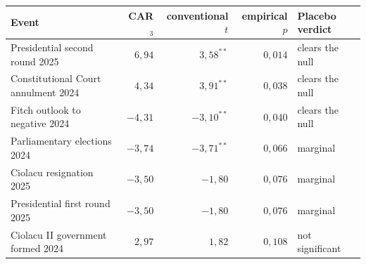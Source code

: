 {\footnotesize\setlength{\tabcolsep}{4pt}
\begin{tabular}{lrrrl}
\toprule
Event & CAR$_3$ & conventional $t$ & empirical $p$ & Placebo verdict \\
\midrule
Presidential second round 2025 & $6{,}94$ & $3{,}58^{**}$ & $0{,}014$ & clears the null \\
Constitutional Court annulment 2024 & $4{,}34$ & $3{,}91^{**}$ & $0{,}038$ & clears the null \\
Fitch outlook to negative 2024 & $-4{,}31$ & $-3{,}10^{**}$ & $0{,}040$ & clears the null \\
Parliamentary elections 2024 & $-3{,}74$ & $-3{,}71^{**}$ & $0{,}066$ & marginal \\
Ciolacu resignation 2025 & $-3{,}50$ & $-1{,}80$ & $0{,}076$ & marginal \\
Presidential first round 2025 & $-3{,}50$ & $-1{,}80$ & $0{,}076$ & marginal \\
Ciolacu II government formed 2024 & $2{,}97$ & $1{,}82$ & $0{,}108$ & not significant \\
\bottomrule
\end{tabular}}
